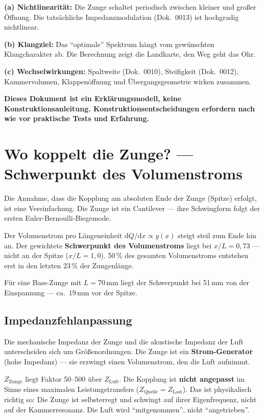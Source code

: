 \documentclass[11pt,a4paper]{article}
\begin{document}
\textbf{(a) Nichtlinearität:} Die Zunge schaltet periodisch zwischen
kleiner und großer Öffnung. Die tatsächliche Impedanzmodulation
(Dok.~0013) ist hochgradig nichtlinear.

\textbf{(b) Klangziel:} Das ``optimale'' Spektrum hängt vom gewünschten
Klangcharakter ab. Die Berechnung zeigt die Landkarte, den Weg geht das Ohr.

\textbf{(c) Wechselwirkungen:} Spaltweite (Dok.~0010), Steifigkeit (Dok.~0012),
Kammervolumen, Klappenöffnung und Übergangsgeometrie wirken zusammen.

\begin{tcolorbox}[colframe=red!60!black, colback=red!5!white]
\textbf{Dieses Dokument ist ein Erklärungsmodell, keine Konstruktionsanleitung.
Konstruktionsentscheidungen erfordern nach wie vor praktische Tests und Erfahrung.}
\end{tcolorbox}

\section{Wo koppelt die Zunge? --- Schwerpunkt des Volumenstroms}

Die Annahme, dass die Kopplung am absoluten Ende der Zunge (Spitze) erfolgt,
ist eine Vereinfachung. Die Zunge ist ein Cantilever --- ihre Schwingform
folgt der ersten Euler-Bernoulli-Biegemode.

Der Volumenstrom pro Längeneinheit $\mathrm{d}Q/\mathrm{d}x \propto y(x)$
steigt steil zum Ende hin an. Der gewichtete \textbf{Schwerpunkt des
Volumenstroms} liegt bei $x/L = 0{,}73$ --- nicht an der Spitze ($x/L = 1{,}0$).
50\,\% des gesamten Volumenstroms entstehen erst in den letzten 23\,\%
der Zungenlänge.

Für eine Bass-Zunge mit $L = 70$\,mm liegt der Schwerpunkt bei 51\,mm
von der Einspannung --- ca.\ 19\,mm vor der Spitze.

\subsection{Impedanzfehlanpassung}

Die mechanische Impedanz der Zunge und die akustische Impedanz der Luft
unterscheiden sich um Größenordnungen. Die Zunge ist ein
\textbf{Strom-Generator} (hohe Impedanz) --- sie erzwingt einen Volumenstrom,
den die Luft aufnimmt.

$Z_\mathrm{Zunge}$ liegt Faktor 50--500 über $Z_\mathrm{Luft}$.
Die Kopplung ist \textbf{nicht angepasst} im Sinne eines maximalen
Leistungstransfers ($Z_\mathrm{Quelle} = Z_\mathrm{Last}$).
Das ist physikalisch richtig so: Die Zunge ist selbsterregt und schwingt
auf ihrer Eigenfrequenz, nicht auf der Kammerresonanz. Die Luft wird
``mitgenommen'', nicht ``angetrieben''.
\end{document}
